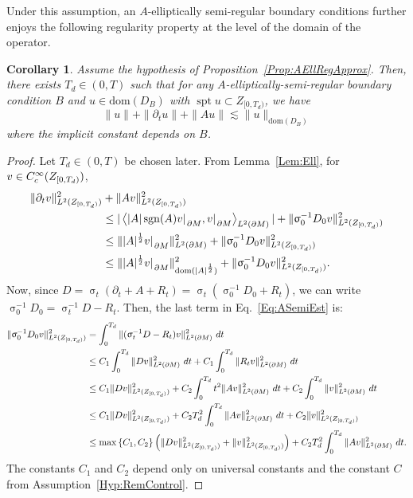 \documentclass[a4paper,10pt,reqno]{amsart}
\newcommand{\sym}{\upsigma}
\newcommand{\rest}[1]{{{\lvert_{}}_{}}_{#1}}
\newcommand{\cbrac}[1]{\left(#1\right)}
\newcommand{\dbrac}[1]{\left\{#1\right\}}
\newcommand{\modulus}[1]{|#1|}
\newcommand{\norm}[1]{\| #1 \|}%
\newcommand{\set}[1]{\dbrac{#1}}
\newcommand{\Lp}[2][{}]{{\rm L}^{#2}_{\rm #1}}%
\newcommand{\Ck}[2][{}]{{\rm C}^{#2}_{\rm #1}}%
\newcommand{\dom}{\mathrm{dom}}
\DeclareMathOperator{\spt}{spt}%
\DeclareMathOperator{\sgn}{sgn}%
\newcommand{\inprod}[1]{\left\langle #1 \right\rangle}%
\newcommand{\dM}{\partial M}
\newtheorem{corollary}[theorem]{Corollary}
\theoremstyle{definition}
\begin{document}
Under this assumption, an $A$-elliptically semi-regular boundary conditions further enjoys the following regularity property at the level of the domain of the operator. 
\begin{corollary}
\label{Cor:ASemiRegNearBoundary} 
Assume the hypothesis of Proposition~\ref{Prop:AEllRegApprox}. 
Then, there exists  $T_d \in (0,T)$ such that  for any $A$-elliptically-semi-regular boundary condition $B$ and $u \in \dom(D_B)$ with $\spt u \subset Z_{[0,T_d)}$, we have
$$ \norm{u} +  \norm{\partial_t u} + \norm{A u} \lesssim \norm{u}_{\dom(D_B)}$$ 
where the implicit constant depends on $B$. 
\end{corollary}
\begin{proof}
Let $T_d \in (0,T)$ be chosen later.
From Lemma~\ref{Lem:Ell}, for $v \in \Ck[c]{\infty}(Z_{[0,T_d)})$, 
\begin{equation}
\label{Eq:ASemiEst} 
\begin{aligned}
\norm{\partial_t v}^2_{\Lp{2}(Z_{[0,T_d)})} &+ \norm{Av}^2 _{\Lp{2}(Z_{[0,T_d)})}  \\
&\leq
\modulus{\inprod{\modulus{A}\sgn(A) v\rest{\dM}, v\rest{\dM}}_{\Lp{2}(\dM)}} + \norm{\sym_0^{-1} D_0v}^2_{\Lp{2}(Z_{[0,T_d)})} \\
&\leq
\norm{\modulus{A}^{\frac12} v\rest{\dM}}_{\Lp{2}(\dM)}^2 + \norm{\sym_0^{-1} D_0 v}^2_{\Lp{2}(Z_{[0,T_d)})} \\ 
&\leq
\norm{\modulus{A}^{\frac12} v\rest{\dM}}_{\dom(\modulus{A}^{\frac12})}^2 + \norm{\sym_0^{-1} D_0 v}^2_{\Lp{2}(Z_{[0,T_d)})}.
\end{aligned}
\end{equation}
Now, since $D = \sym_t(\partial_t + A + R_t) = \sym_t(\sym_0^{-1} D_0 + R_t)$, we can write $\sym_0^{-1} D_0 = \sym_t^{-1} D - R_t$.
Then, the last term in Eq.~\eqref{Eq:ASemiEst} is:  
\begin{equation}
\label{Eq:ASemiEst1}  
\begin{aligned} 
\norm{\sym_0^{-1} D_0 v}^2_{\Lp{2}(Z_{[0,T_d)})} 
&= 
\int_{0}^{T_d} \norm{(\sym_t^{-1} D - R_t)v}_{\Lp{2}(\dM)}^2\ dt \\ 
&\leq
C_1 \int_{0}^{T_d}  \norm{Dv}^2_{\Lp{2}(\dM)}\ dt + C_1 \int_{0}^{T_d}  \norm{R_t v}^2_{\Lp{2}(\dM)}\ dt \\
&\leq 
C_1 \norm{Dv}^2_{\Lp{2}(Z_{[0,T_d)})} + C_2 \int_{0}^{T_d}  t^2 \norm{Av}^2_{\Lp{2}(\dM)}\ dt  + C_2 \int_{0}^{T_d} \norm{v}_{\Lp{2}(\dM)}^2\ dt \\
&\leq 
C_1 \norm{Dv}^2_{\Lp{2}(Z_{[0,T_d)})} + C_2 T_d^2 \int_{0}^{T_d} \norm{Av}^2_{\Lp{2}(\dM)}\ dt  + C_2 \norm{v}_{\Lp{2}(Z_{[0,T_d)})}^2 \\
&\leq
\max\set{C_1, C_2} \cbrac{\norm{Dv}^2_{\Lp{2}(Z_{[0,T_d)})} + \norm{v}_{\Lp{2}(Z_{[0,T_d)})}^2} + C_2 T_d^2 \int_{0}^{T_d} \norm{Av}^2_{\Lp{2}(\dM)}\ dt.
\end{aligned} 
\end{equation}
The constants $C_1$ and $C_2$ depend only on universal constants and the constant $C$ from Assumption~\ref{Hyp:RemControl}.


\end{proof}
\end{document}

